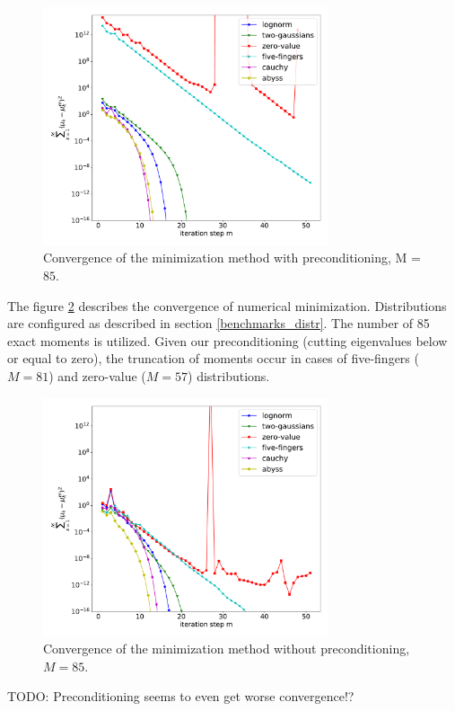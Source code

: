 \documentclass{article}
\def\todo#1{{\color{red}TODO: #1}}
\begin{document}
\begin{figure}[!htb]
\begin{center} 
\includegraphics[width=0.75\textwidth]{mu_err_iterations.pdf}
\end{center} 
\caption{Convergence of the minimization method with preconditioning, M = $85$.}
\label{fig:convergence}
\end{figure} 
\FloatBarrier
The figure \ref{fig:convergence} describes the convergence of numerical minimization. Distributions are configured as described in section \ref{benchmarks_distr}. The number of 85 exact moments is utilized. Given our preconditioning (cutting eigenvalues below or equal to zero), the truncation of moments occur in cases of five-fingers ($M=81$) and zero-value ($M=57$) distributions.
\begin{figure}[!htb]
\begin{center} 
\includegraphics[width=0.75\textwidth]{mu_err_iterations_no_precond.pdf}
\end{center} 
\caption{Convergence of the minimization method without preconditioning, $M = 85$.}
\label{fig:convergence}
\end{figure} 
\FloatBarrier
\todo{Preconditioning seems to even get worse convergence!?}
\end{document}
